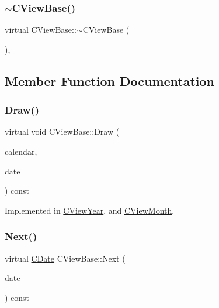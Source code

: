 \subsubsection{\texorpdfstring{$\sim$\+C\+View\+Base()}{~CViewBase()}}
{\footnotesize\ttfamily virtual C\+View\+Base\+::$\sim$\+C\+View\+Base (\begin{DoxyParamCaption}{ }\end{DoxyParamCaption})\hspace{0.3cm}{\ttfamily [virtual]}, {\ttfamily [default]}}



\subsection{Member Function Documentation}
\mbox{\label{class_c_view_base_a10a44a3680cc7ba6cd42ed99d128ed22}} 
\subsubsection{\texorpdfstring{Draw()}{Draw()}}
{\footnotesize\ttfamily virtual void C\+View\+Base\+::\+Draw (\begin{DoxyParamCaption}\item[{const \mbox{\hyperlink{class_c_calendar}{C\+Calendar}} \&}]{calendar,  }\item[{const \mbox{\hyperlink{class_c_date}{C\+Date}} \&}]{date }\end{DoxyParamCaption}) const\hspace{0.3cm}{\ttfamily [pure virtual]}}



Implemented in \mbox{\hyperlink{class_c_view_year_ad8f7c1b95dc1e46ae842f9e36aff6669}{C\+View\+Year}}, and \mbox{\hyperlink{class_c_view_month_acfed5c2bd785ee77f5528539a46f743c}{C\+View\+Month}}.

\mbox{\label{class_c_view_base_afac2271f0a54dfa083246d4e9c3d0742}} 
\subsubsection{\texorpdfstring{Next()}{Next()}}
{\footnotesize\ttfamily virtual \mbox{\hyperlink{class_c_date}{C\+Date}} C\+View\+Base\+::\+Next (\begin{DoxyParamCaption}\item[{const \mbox{\hyperlink{class_c_date}{C\+Date}} \&}]{date }\end{DoxyParamCaption}) const\hspace{0.3cm}{\ttfamily [pure virtual]}}




